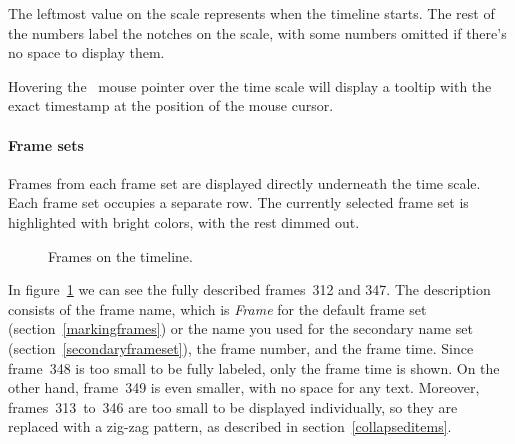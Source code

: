\documentclass[hidelinks,titlepage,a4paper,twoside]{article}
\begin{document}
The leftmost value on the scale represents when the timeline starts. The rest of the numbers label the notches on the scale, with some numbers omitted if there's no space to display them.

Hovering the \faArrowPointer{}~mouse pointer over the time scale will display a tooltip with the exact timestamp at the position of the mouse cursor.

\paragraph{Frame sets}
\label{framesets}

Frames from each frame set are displayed directly underneath the time scale. Each frame set occupies a separate row. The currently selected frame set is highlighted with bright colors, with the rest dimmed out.

\begin{figure}[h]
\centering{}
\caption{Frames on the timeline.}
\label{framesetsfig}
\end{figure}

In figure~\ref{framesetsfig} we can see the fully described frames~312 and 347. The description consists of the frame name, which is \emph{Frame} for the default frame set (section~\ref{markingframes}) or the name you used for the secondary name set (section~\ref{secondaryframeset}), the frame number, and the frame time. Since frame~348 is too small to be fully labeled, only the frame time is shown. On the other hand, frame~349 is even smaller, with no space for any text. Moreover, frames~313~to~346 are too small to be displayed individually, so they are replaced with a zig-zag pattern, as described in section~\ref{collapseditems}.
\end{document}
